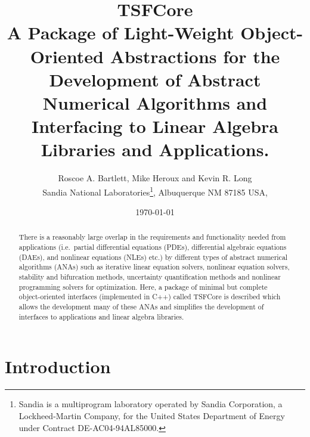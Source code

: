 \documentclass[10pt,fleqn]{article}
\begin{document}
%
%
\title{
{\Huge\bf TSFCore}\\[1.5ex]
A Package of Light-Weight Object-Oriented Abstractions for the
Development of Abstract Numerical Algorithms and Interfacing
to Linear Algebra Libraries and Applications.
}
\author{Roscoe A. Bartlett, Mike Heroux and Kevin R. Long \\
Sandia National Laboratories\footnote{
Sandia is a multiprogram laboratory operated by Sandia Corporation, a
Lockheed-Martin Company, for the United States Department of Energy
under Contract DE-AC04-94AL85000.}, Albuquerque NM 87185 USA, \\
}
\date{\today}

\maketitle

%
\begin{abstract}
%

There is a reasonably large overlap in the requirements and
functionality needed from applications (i.e.~partial differential
equations (PDEs), differential algebraic equations (DAEs), and
nonlinear equations (NLEs) etc.) by different types of abstract
numerical algorithms (ANAs) such as iterative linear equation solvers,
nonlinear equation solvers, stability and bifurcation methods,
uncertainty quantification methods and nonlinear programming solvers
for optimization.  Here, a package of minimal but complete
object-oriented interfaces (implemented in C++) called TSFCore is
described which allows the development many of these ANAs and
simplifies the development of interfaces to applications and linear
algebra libraries.

%
\end{abstract}
%

\tableofcontents

\listoffigures

\section{Introduction}
\end{document}

